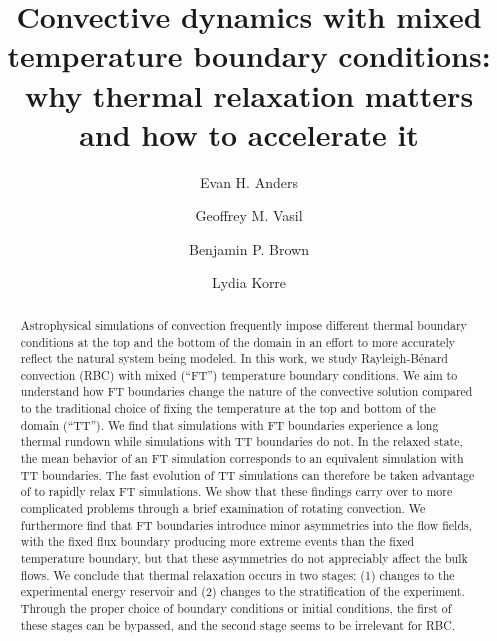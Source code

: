 \documentclass[aps, pre, onecolumn, nofootinbib, notitlepage, groupedaddress, amsfonts, amssymb, amsmath, longbibliography, superscriptaddress]{revtex4-1}
\newcommand{\RB}{Rayleigh-B\'{e}nard }
\begin{document}
\author{Evan H. Anders}
\author{Geoffrey M. Vasil}
\author{Benjamin P. Brown}
\author{Lydia Korre}

\title{Convective dynamics with mixed temperature boundary conditions: \\
why thermal relaxation matters and how to accelerate it}

\begin{abstract}
Astrophysical simulations of convection frequently impose different thermal boundary conditions at the top and the bottom of the domain in an effort to more accurately reflect the natural system being modeled.
In this work, we study \RB convection (RBC) with mixed (``FT'') temperature boundary conditions.
We aim to understand how FT boundaries change the nature of the convective solution compared to the traditional choice of fixing the temperature at the top and bottom of the domain (``TT'').
We find that simulations with FT boundaries experience a long thermal rundown while simulations with TT boundaries do not.
In the relaxed state, the mean behavior of an FT simulation corresponds to an equivalent simulation with TT boundaries.
The fast evolution of TT simulations can therefore be taken advantage of to rapidly relax FT simulations.
We show that these findings carry over to more complicated problems through a brief examination of rotating convection.
We furthermore find that FT boundaries introduce minor asymmetries into the flow fields, with the fixed flux boundary producing more extreme events than the fixed temperature boundary, but that these asymmetries do not appreciably affect the bulk flows.
We conclude that thermal relaxation occurs in two stages: (1) changes to the experimental energy reservoir and (2) changes to the stratification of the experiment.
Through the proper choice of boundary conditions or initial conditions, the first of these stages can be bypassed, and the second stage seems to be irrelevant for RBC.
\end{abstract}
\maketitle
\end{document}
